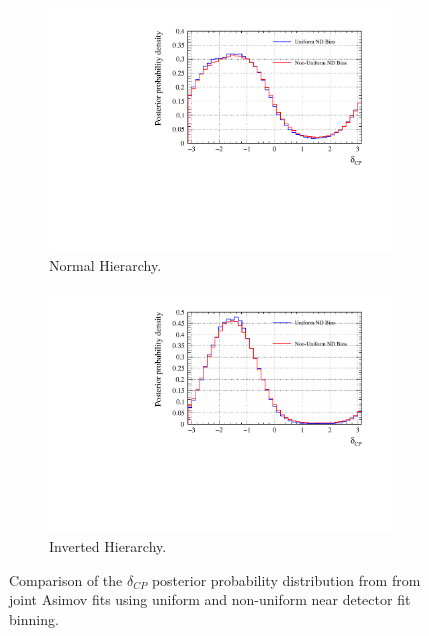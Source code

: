 \begin{figure}
\centering
\begin{subfigure}{.7\textwidth}
  \centering
  \includegraphics[width=0.95\linewidth]{figs/comparedmach3contours_PolyvsTH2DKevin/comparedmach3contours_RCeff_dcp_asimovA_NH}
  \caption{Normal Hierarchy.}
  \label{fig:TH2DPolydcpNH}
\end{subfigure}
\begin{subfigure}{.7\textwidth}
  \centering
  \includegraphics[width=0.95\linewidth]{figs/comparedmach3contours_PolyvsTH2DKevin/comparedmach3contours_RCeff_dcp_asimovA_IH}
  \caption{Inverted Hierarchy.}
  \label{fig:TH2DPolydcpIH}
\end{subfigure}
\caption{Comparison of the $\delta_{CP}$ posterior probability distribution from from joint Asimov fits using uniform and non-uniform near detector fit binning.}
\label{fig:TH2DPolydcp}
\end{figure}

